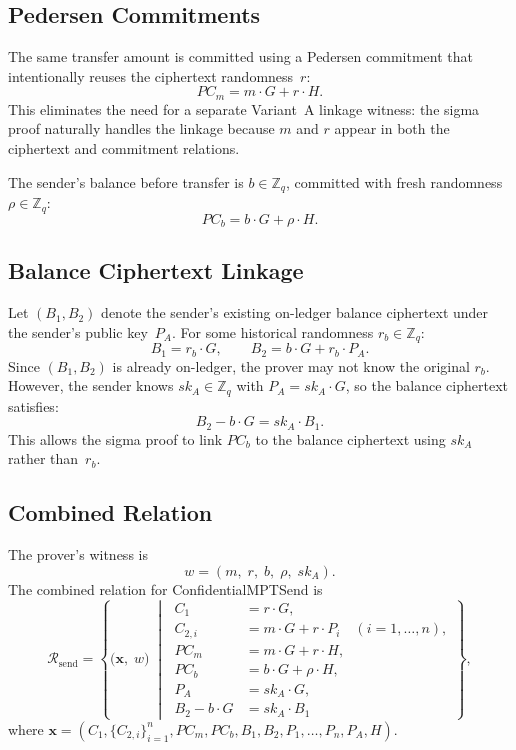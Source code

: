 \documentclass[11pt]{article}
\theoremstyle{definition}
\newcommand{\Zq}{\mathbb{Z}_q}
\newcommand{\sk}{\mathit{sk}}
\begin{document}
\subsection{Pedersen Commitments}

The same transfer amount is committed using a Pedersen commitment
that intentionally reuses the ciphertext randomness~$r$:
\[
  \mathit{PC}_m = m \cdot G + r \cdot H.
\]
This eliminates the need for a separate Variant~A linkage witness:
the sigma proof naturally handles the linkage because $m$ and $r$
appear in both the ciphertext and commitment relations.

The sender's balance before transfer is $b \in \Zq$, committed with
fresh randomness $\rho \in \Zq$:
\[
  \mathit{PC}_b = b \cdot G + \rho \cdot H.
\]

\subsection{Balance Ciphertext Linkage}

Let $(B_1, B_2)$ denote the sender's existing on-ledger balance
ciphertext under the sender's public key~$P_A$.
For some historical randomness $r_b \in \Zq$:
\[
  B_1 = r_b \cdot G, \qquad
  B_2 = b \cdot G + r_b \cdot P_A.
\]
Since $(B_1, B_2)$ is already on-ledger, the prover may not know the
original $r_b$.
However, the sender knows $\sk_A \in \Zq$ with $P_A = \sk_A \cdot G$,
so the balance ciphertext satisfies:
\[
  B_2 - b \cdot G = \sk_A \cdot B_1.
\]
This allows the sigma proof to link $\mathit{PC}_b$ to the balance
ciphertext using $\sk_A$ rather than~$r_b$.

\subsection{Combined Relation}

The prover's witness is
\[
  w = (m,\; r,\; b,\; \rho,\; \sk_A).
\]
The combined relation for \textsf{ConfidentialMPTSend} is
\begin{equation}
  \label{eq:combined-relation}
  \mathcal{R}_{\mathrm{send}} = \left\{
  \bigl(
    \mathbf{x},\; w
  \bigr)
  \;\middle|\;
  \begin{aligned}
    C_1 &= r \cdot G, \\
    C_{2,i} &= m \cdot G + r \cdot P_i
      \quad (i = 1, \ldots, n), \\
    \mathit{PC}_m &= m \cdot G + r \cdot H, \\
    \mathit{PC}_b &= b \cdot G + \rho \cdot H, \\
    P_A &= \sk_A \cdot G, \\
    B_2 - b \cdot G &= \sk_A \cdot B_1
  \end{aligned}
  \right\},
\end{equation}
where $\mathbf{x} = (C_1, \{C_{2,i}\}_{i=1}^n, \mathit{PC}_m,
\mathit{PC}_b, B_1, B_2, P_1, \ldots, P_n, P_A, H)$.
\end{document}
